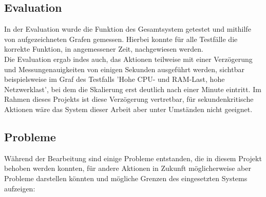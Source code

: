 \documentclass[a4paper,10pt]{scrartcl}
\begin{document}
\subsection{Evaluation}

In der Evaluation wurde die Funktion des Gesamtsystem getestet und mithilfe von aufgezeichneten Grafen gemessen. Hierbei konnte für alle Testfälle die korrekte Funktion, in angemessener Zeit, nachgewiesen werden.\\
Die Evaluation ergab indes auch, das Aktionen teilweise mit einer Verzögerung und Messungenauigkeiten von einigen Sekunden ausgeführt werden, sichtbar beispielsweise im Graf des Testfalls 'Hohe CPU- und RAM-Last, hohe Netzwerklast', bei dem die Skalierung erst deutlich nach einer Minute eintritt. Im Rahmen dieses Projekts ist diese Verzögerung vertretbar, für sekundenkritische Aktionen wäre das System dieser Arbeit aber unter Umständen nicht geeignet.\\


\subsection{Probleme}

Während der Bearbeitung sind einige Probleme entstanden, die in diesem Projekt behoben werden konnten, für andere Aktionen in Zukunft möglicherweise aber Probleme darstellen könnten und mögliche Grenzen des eingesetzten Systems aufzeigen:\\
\end{document}
